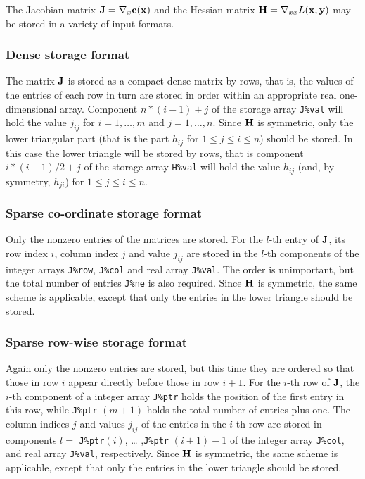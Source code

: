 \documentclass{galahad}
\begin{document}

\galmatrix
The Jacobian matrix ${\mathbf{J}} = \nabla_x{\mathbf{c}}({\mathbf{x}})$ and the Hessian matrix ${\mathbf{H}} = \nabla_{xx} L({\mathbf{x}},{\mathbf{y}})$
may be stored in a variety of input formats.

\subsubsection{Dense storage format}\label{dense}
The matrix ${\mathbf{J}}$ is stored as a compact 
dense matrix by rows, that is, the values of the entries of each row in turn are
stored in order within an appropriate real one-dimensional array.
Component $n \ast (i-1) + j$ of the storage array {\tt J\%val} will hold the 
value $j_{ij}$ for $i = 1, \ldots , m$ and $j = 1, \ldots , n$.
Since ${\mathbf{H}}$ is symmetric, only the lower triangular part (that is the part 
$h_{ij}$ for $1 \leq j \leq i \leq n$) should be stored.  In this case
the lower triangle will be stored by rows, that is 
component $i \ast (i-1)/2 + j$ of the storage array {\tt H\%val}  
will hold the value $h_{ij}$ (and, by symmetry, $h_{ji}$)
for $1 \leq j \leq i \leq n$.

\subsubsection{Sparse co-ordinate storage format}\label{coordinate}
Only the nonzero entries of the matrices are stored. For the $l$-th
entry of ${\mathbf{J}}$, its row index $i$, column index $j$ and value
$j_{ij}$ are stored in the $l$-th components of the integer arrays
{\tt J\%row}, {\tt J\%col} and real array {\tt J\%val}.  The order is
unimportant, but the total number of entries {\tt J\%ne} is also
required.  Since ${\mathbf{H}}$ is symmetric, the same scheme is applicable,
except that only the entries in the lower triangle should be stored.

\subsubsection{Sparse row-wise storage format}\label{rowwise}
Again only the nonzero entries are stored, but this time they are
ordered so that those in row $i$ appear directly before those in row
$i+1$. For the $i$-th row of ${\mathbf{J}}$, the $i$-th component of a integer
array {\tt J\%ptr} holds the position of the first entry in this row,
while {\tt J\%ptr} $(m+1)$ holds the total number of entries plus one.
The column indices $j$ and values $j_{ij}$ of the entries in the
$i$-th row are stored in components $l =$ {\tt J\%ptr}$(i)$, \ldots
,{\tt J\%ptr} $(i+1)-1$ of the integer array {\tt J\%col}, and real
array {\tt J\%val}, respectively.  Since ${\mathbf{H}}$ is symmetric, the same
scheme is applicable, except that only the entries in the lower
triangle should be stored.
\end{document}
